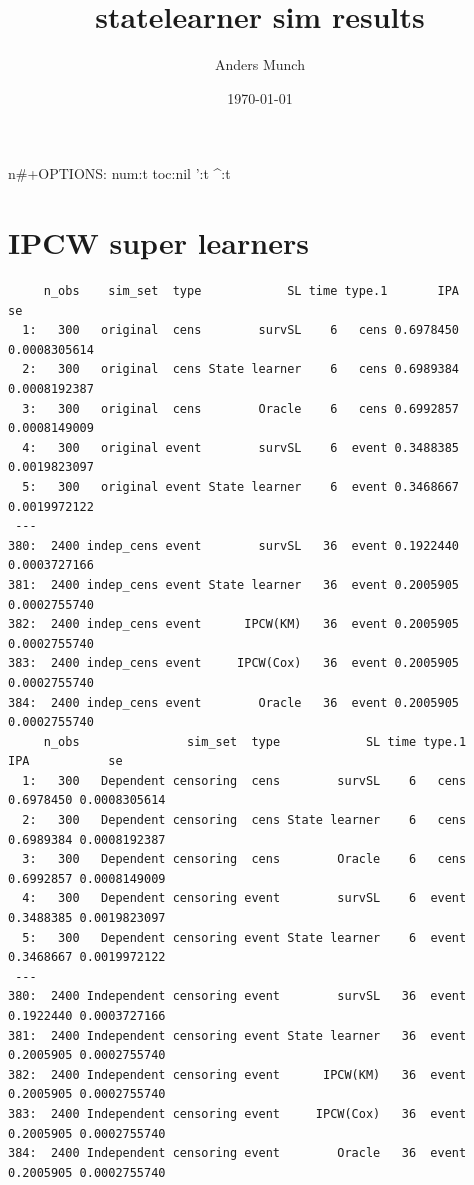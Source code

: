 \documentclass[11pt]{article}
\author{Anders Munch}
\date{\today}
\title{statelearner sim results}
\begin{document}
\maketitle
\tableofcontents

n\#+OPTIONS:   num:t toc:nil ':t \^{}:t

\section{IPCW super learners}
\label{sec:org30b08e8}

\begin{verbatim}
     n_obs    sim_set  type            SL time type.1       IPA           se
  1:   300   original  cens        survSL    6   cens 0.6978450 0.0008305614
  2:   300   original  cens State learner    6   cens 0.6989384 0.0008192387
  3:   300   original  cens        Oracle    6   cens 0.6992857 0.0008149009
  4:   300   original event        survSL    6  event 0.3488385 0.0019823097
  5:   300   original event State learner    6  event 0.3468667 0.0019972122
 ---                                                                        
380:  2400 indep_cens event        survSL   36  event 0.1922440 0.0003727166
381:  2400 indep_cens event State learner   36  event 0.2005905 0.0002755740
382:  2400 indep_cens event      IPCW(KM)   36  event 0.2005905 0.0002755740
383:  2400 indep_cens event     IPCW(Cox)   36  event 0.2005905 0.0002755740
384:  2400 indep_cens event        Oracle   36  event 0.2005905 0.0002755740
     n_obs               sim_set  type            SL time type.1       IPA           se
  1:   300   Dependent censoring  cens        survSL    6   cens 0.6978450 0.0008305614
  2:   300   Dependent censoring  cens State learner    6   cens 0.6989384 0.0008192387
  3:   300   Dependent censoring  cens        Oracle    6   cens 0.6992857 0.0008149009
  4:   300   Dependent censoring event        survSL    6  event 0.3488385 0.0019823097
  5:   300   Dependent censoring event State learner    6  event 0.3468667 0.0019972122
 ---                                                                                   
380:  2400 Independent censoring event        survSL   36  event 0.1922440 0.0003727166
381:  2400 Independent censoring event State learner   36  event 0.2005905 0.0002755740
382:  2400 Independent censoring event      IPCW(KM)   36  event 0.2005905 0.0002755740
383:  2400 Independent censoring event     IPCW(Cox)   36  event 0.2005905 0.0002755740
384:  2400 Independent censoring event        Oracle   36  event 0.2005905 0.0002755740
\end{verbatim}
\end{document}
